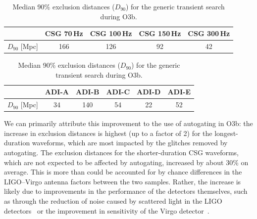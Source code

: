 \begin{table}[h]
  \hspace{0.5cm}
  \caption
  {\label{tab:grb-o3b-x-exclusion} Median 90\% exclusion distances ($D_{90}$) for the generic transient search during O3b.}
  \begin{tabular}{c c c c c}
    \hline
    \hline
    \rule{0pt}{4ex}
    & CSG 70\,Hz & CSG 100\,Hz & CSG 150\,Hz & CSG 300\,Hz \\
    \hline
    \rule[-2ex]{0pt}{4ex}
    $D_{90}$ [Mpc] & 166 & 126 & 92 & 42
  \end{tabular}
  \begin{tabular}{c c c c c c}
    \hline
    \hline
    \rule{0pt}{4ex}
    & ADI-A & ADI-B & ADI-C & ADI-D & ADI-E \\
    \hline
    \rule[-2ex]{0pt}{4ex}
    $D_{90}$ [Mpc] & 34 & 140 & 54 & 22 & 52 \\
    \hline
  \end{tabular}
\end{table}

We can primarily attribute this improvement to the use of autogating in O3b: the increase in exclusion distances is highest (up to a factor of 2) for the longest-duration waveforms, which are most impacted by the glitches removed by autogating.
The exclusion distances for the shorter-duration CSG waveforms, which are not expected to be affected by autogating, increased by about 30\% on average.
This is more than could be accounted for by chance differences in the LIGO–Virgo antenna factors between the two samples.
Rather, the increase is likely due to improvements in the performance of the detectors themselves, such as through the reduction of noise caused by scattered light in the LIGO detectors~\citep{Soni_2020} or the improvement in sensitivity of the Virgo detector~\citep{Davis_2021}.


